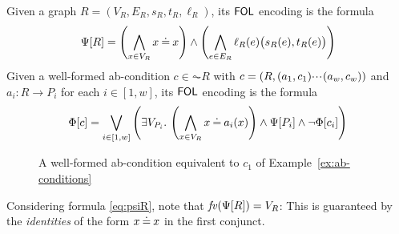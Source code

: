 \begin{definition}
  \label{def:encoding}
  Given a graph $R = (V_R, E_R, s_R, t_R, \ell_R)$, its $\mathsf{FOL}$ encoding is the formula   
\begin{equation}
\grtofol R = %
\left( \bigwedge_{x\in V_R}{x\Eq x} \right) \wedge
\left( \bigwedge_{e\in E_R} \ell_R(e)\bigl(s_R(e),t_R(e)\bigr) \right) \label{eq:psiR}
\end{equation}
%
Given a well-formed ab-condition $c\in \AC R$ with $c=(R,(a_1,c_1){\cdotp\mkern-2mu\cdotp\mkern-2mu\cdotp\mkern1mu} (a_w,c_w))$ and $a_i:R \to P_i$ for each $i \in [1,w]$, its $\mathsf{FOL}$ encoding is the formula 
%
\begin{align}
\tofol c = %
  \bigvee_{i\in [1,w]} \left(\exists V_{P_i}\st  \left(\bigwedge_{x \in V_{R}} x \Eq a_i(x)\right) \land \grtofol {P_i} \land \neg \tofol {c_i}\right)\label{eq:phiC}
\end{align}
\end{definition}
%
\begin{figure}[t]
  \centering
{}
\caption{A well-formed ab-condition equivalent to $c_1$ of Example~\ref{ex:ab-conditions}}
\label{fig:ab-condition-c}
\end{figure}
%
Considering formula \eqref{eq:psiR}, note that $\mathit{fv}(\Psi[{R}]) = V_R$: This is guaranteed by the \emph{identities} of the form $x\mathbin{\doteq} x$ in the first conjunct. 

